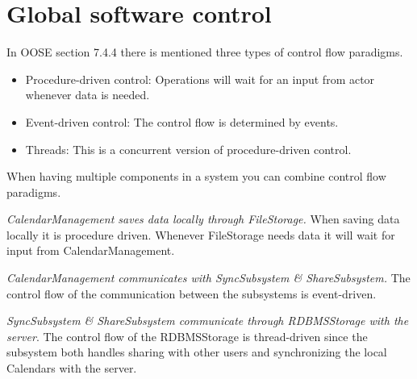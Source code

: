 \section{Global software control}

In OOSE section 7.4.4 there is mentioned three types of control flow paradigms. 

\begin{itemize}
	\item Procedure-driven control: Operations will wait for an input from actor whenever data is needed. 
	\item Event-driven control: The control flow is determined by events.
	\item Threads: This is a concurrent version of procedure-driven control.
\end{itemize}

 When having multiple components in a system you can combine control flow paradigms.
 
 \emph{CalendarManagement saves data locally through FileStorage.} When saving data locally it is procedure driven. Whenever FileStorage needs data it will wait for input from CalendarManagement.
 
 \emph{CalendarManagement communicates with SyncSubsystem \& ShareSubsystem.} The control flow of the communication between the subsystems is event-driven.
 
 \emph{SyncSubsystem \& ShareSubsystem communicate through RDBMSStorage with the server}. The control flow of the RDBMSStorage is thread-driven since the subsystem both handles sharing with other users and synchronizing the local Calendars with the server. 